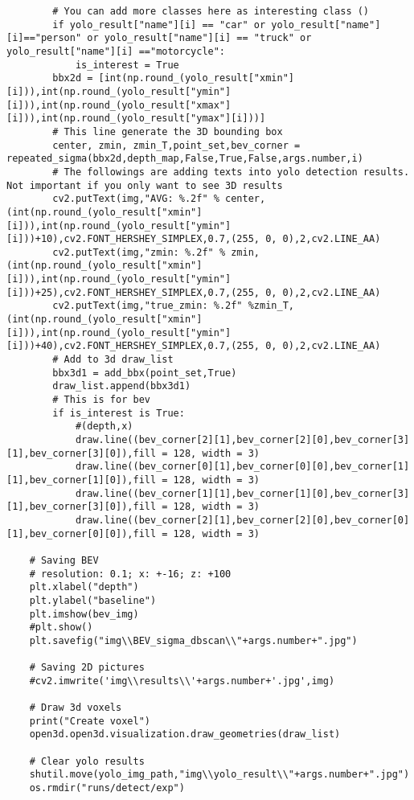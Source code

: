 \begin{lstlisting}
        # You can add more classes here as interesting class ()
        if yolo_result["name"][i] == "car" or yolo_result["name"][i]=="person" or yolo_result["name"][i] == "truck" or yolo_result["name"][i] =="motorcycle":
            is_interest = True
        bbx2d = [int(np.round_(yolo_result["xmin"][i])),int(np.round_(yolo_result["ymin"][i])),int(np.round_(yolo_result["xmax"][i])),int(np.round_(yolo_result["ymax"][i]))]
        # This line generate the 3D bounding box
        center, zmin, zmin_T,point_set,bev_corner = repeated_sigma(bbx2d,depth_map,False,True,False,args.number,i)
        # The followings are adding texts into yolo detection results. Not important if you only want to see 3D results
        cv2.putText(img,"AVG: %.2f" % center,(int(np.round_(yolo_result["xmin"][i])),int(np.round_(yolo_result["ymin"][i]))+10),cv2.FONT_HERSHEY_SIMPLEX,0.7,(255, 0, 0),2,cv2.LINE_AA)
        cv2.putText(img,"zmin: %.2f" % zmin,(int(np.round_(yolo_result["xmin"][i])),int(np.round_(yolo_result["ymin"][i]))+25),cv2.FONT_HERSHEY_SIMPLEX,0.7,(255, 0, 0),2,cv2.LINE_AA)
        cv2.putText(img,"true_zmin: %.2f" %zmin_T,(int(np.round_(yolo_result["xmin"][i])),int(np.round_(yolo_result["ymin"][i]))+40),cv2.FONT_HERSHEY_SIMPLEX,0.7,(255, 0, 0),2,cv2.LINE_AA)
        # Add to 3d draw_list
        bbx3d1 = add_bbx(point_set,True)
        draw_list.append(bbx3d1)
        # This is for bev
        if is_interest is True:
            #(depth,x)
            draw.line((bev_corner[2][1],bev_corner[2][0],bev_corner[3][1],bev_corner[3][0]),fill = 128, width = 3)
            draw.line((bev_corner[0][1],bev_corner[0][0],bev_corner[1][1],bev_corner[1][0]),fill = 128, width = 3)
            draw.line((bev_corner[1][1],bev_corner[1][0],bev_corner[3][1],bev_corner[3][0]),fill = 128, width = 3)
            draw.line((bev_corner[2][1],bev_corner[2][0],bev_corner[0][1],bev_corner[0][0]),fill = 128, width = 3)

    # Saving BEV
    # resolution: 0.1; x: +-16; z: +100
    plt.xlabel("depth")
    plt.ylabel("baseline")
    plt.imshow(bev_img)
    #plt.show()
    plt.savefig("img\\BEV_sigma_dbscan\\"+args.number+".jpg")

    # Saving 2D pictures
    #cv2.imwrite('img\\results\\'+args.number+'.jpg',img)

    # Draw 3d voxels
    print("Create voxel")
    open3d.open3d.visualization.draw_geometries(draw_list)

    # Clear yolo results
    shutil.move(yolo_img_path,"img\\yolo_result\\"+args.number+".jpg")
    os.rmdir("runs/detect/exp")

\end{lstlisting}

